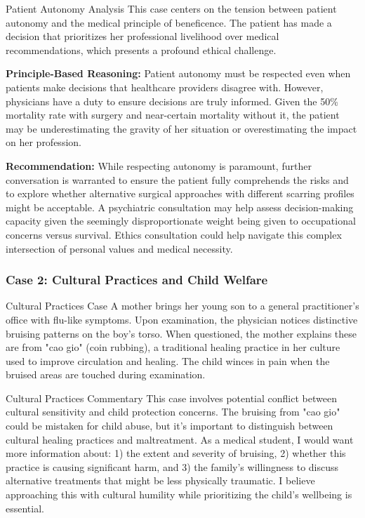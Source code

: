 \documentclass[11pt]{article}
\begin{document}
\begin{analysisbox}{Patient Autonomy Analysis}
This case centers on the tension between patient autonomy and the medical principle of beneficence. The patient has made a decision that prioritizes her professional livelihood over medical recommendations, which presents a profound ethical challenge.

\textbf{Principle-Based Reasoning:} Patient autonomy must be respected even when patients make decisions that healthcare providers disagree with. However, physicians have a duty to ensure decisions are truly informed. Given the 50\% mortality rate with surgery and near-certain mortality without it, the patient may be underestimating the gravity of her situation or overestimating the impact on her profession.

\textbf{Recommendation:} While respecting autonomy is paramount, further conversation is warranted to ensure the patient fully comprehends the risks and to explore whether alternative surgical approaches with different scarring profiles might be acceptable. A psychiatric consultation may help assess decision-making capacity given the seemingly disproportionate weight being given to occupational concerns versus survival. Ethics consultation could help navigate this complex intersection of personal values and medical necessity.
\end{analysisbox}

\subsubsection{Case 2: Cultural Practices and Child Welfare}

\begin{casebox}{Cultural Practices Case}
A mother brings her young son to a general practitioner's office with flu-like symptoms. Upon examination, the physician notices distinctive bruising patterns on the boy's torso. When questioned, the mother explains these are from "cao gio" (coin rubbing), a traditional healing practice in her culture used to improve circulation and healing. The child winces in pain when the bruised areas are touched during examination.
\end{casebox}

\begin{commentarybox}{Cultural Practices Commentary}
This case involves potential conflict between cultural sensitivity and child protection concerns. The bruising from "cao gio" could be mistaken for child abuse, but it's important to distinguish between cultural healing practices and maltreatment. As a medical student, I would want more information about: 1) the extent and severity of bruising, 2) whether this practice is causing significant harm, and 3) the family's willingness to discuss alternative treatments that might be less physically traumatic. I believe approaching this with cultural humility while prioritizing the child's wellbeing is essential.
\end{commentarybox}
\end{document}
